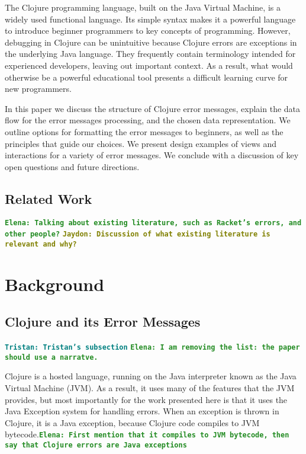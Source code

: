 \documentclass[12pt]{article}
\newcommand{\comment}[1]{{\bf \tt  {#1}}}
\newcommand{\emcomment}[1]{\textcolor{ForestGreen}{\comment{Elena: {#1}}}}
\newcommand{\tkcomment}[1]{\textcolor{Teal}{\comment{Tristan: {#1}}}}
\newcommand{\jscomment}[1]{\textcolor{olive}{\comment{Jaydon: {#1}}}}
\begin{document}
The Clojure programming language, built on the Java Virtual Machine, is a widely used functional language. 
Its simple syntax makes it a powerful language to introduce beginner programmers to key concepts of programming.
However, debugging in Clojure can be unintuitive because Clojure errors are exceptions in the underlying Java language. 
They frequently contain terminology intended for experienced developers, leaving out important context. 
As a result, what would otherwise be a powerful educational tool presents a difficult learning curve for new programmers.

In this paper we discuss the structure of Clojure error messages, 
explain the data flow for the error messages processing, 
and the chosen data representation. 
We outline options for formatting the error messages to beginners, as well as the principles that guide our choices. 
We present design examples of views and interactions for a variety of error messages. 
We conclude with a discussion of key open questions and future directions. 

\subsection{Related Work}\label{subsec:related}

\cite{cosmetic}

\emcomment{Talking about existing literature, such as Racket's errors, and other people?}
\jscomment{Discussion of what existing literature is relevant and why?}

\section{Background}\label{sec:background}

\subsection{Clojure and its Error Messages}\label{subsec:clojure-errs}
\tkcomment{Tristan's subsection}
\emcomment{I am removing the list: the paper should use a narratve. \\}

Clojure is a hosted language, running on the Java interpreter known as the Java Virtual Machine (JVM). As a result, it uses many of the features that the JVM provides,
	 but most importantly for the work presented here is that it uses the Java Exception system for handling errors. When an exception is thrown in Clojure,
	  it is a Java exception, because Clojure code compiles to JVM bytecode.\emcomment{First mention that it compiles to JVM bytecode, then say that Clojure errors are Java exceptions}
    
\end{document}
